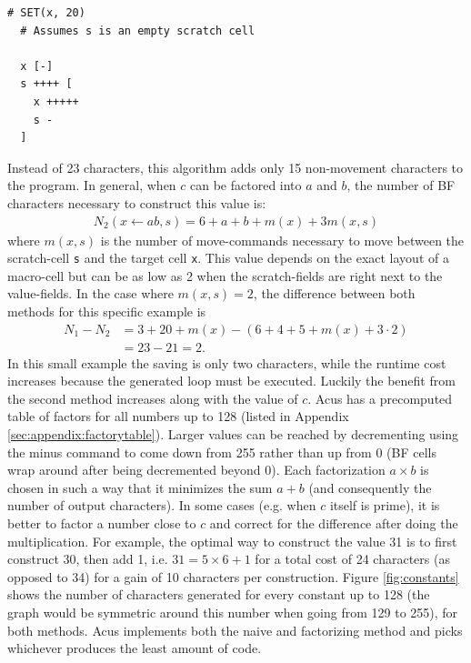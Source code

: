 \vspace{0.5cm}\noindent\begin{minipage}{\linewidth}
\begin{lstlisting}[style=brainfuck]
  # SET(x, 20)
  # Assumes s is an empty scratch cell
  
  x [-]         
  s ++++ [      
    x +++++     
    s -        
  ]
\end{lstlisting}
\end{minipage}
%
Instead of 23 characters, this algorithm adds only 15 non-movement characters to the program. In general, when $c$ can be factored into $a$ and $b$, the number of BF characters necessary to construct this value is:
\begin{align}
  N_2(x\leftarrow ab, s) = 6 + a + b + m(x) + 3m(x, s)
\end{align}
where $m(x,s)$ is the number of move-commands necessary to move between the scratch-cell \texttt{s} and the target cell \texttt{x}. This value depends on the exact layout of a macro-cell but can be as low as 2 when the scratch-fields are right next to the value-fields. In the case where $m(x,s)=2$, the difference between both methods for this specific example is
\begin{align}
  N_1 - N_2 &= 3 + 20 + m(x) - (6 + 4 + 5 + m(x) + 3\cdot 2) \\
            &= 23 - 21 = 2.
\end{align}
In this small example the saving is only two characters, while the runtime cost increases because the generated loop must be executed. Luckily the benefit from the second method increases along with the value of $c$. Acus has a precomputed table of factors for all numbers up to 128 (listed in Appendix \ref{sec:appendix:factorytable}). Larger values can be reached by decrementing using the minus command to come down from 255 rather than up from 0 (BF cells wrap around after being decremented beyond 0). Each factorization $a\times b$ is chosen in such a way that it minimizes the sum $a+b$ (and consequently the number of output characters). In some cases (e.g. when $c$ itself is prime), it is better to factor a number close to $c$ and correct for the difference after doing the multiplication. For example, the optimal way to construct the value 31 is to first construct 30, then add 1, i.e. $31 = 5\times6 + 1$ for a total cost of 24 characters (as opposed to 34) for a gain of 10 characters per construction. Figure \ref{fig:constants} shows the number of characters generated for every constant up to 128 (the graph would be symmetric around this number when going from 129 to 255), for both methods. Acus implements both the naive and factorizing method and picks whichever produces the least amount of code.

